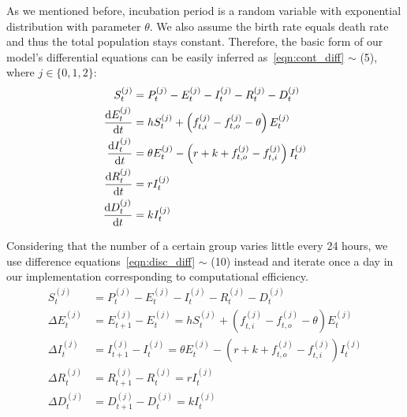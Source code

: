 \documentclass[12pt]{mcmthesis}
\begin{document}
As we mentioned before, incubation period is a random variable with exponential distribution with parameter $\theta$. We also assume the birth rate equals death rate and thus the total population stays constant. Therefore, the basic form of our model's differential equations can be easily inferred as~\eqref{eqn:cont_diff} $\sim$ (5), where $j \in \lbrace 0, 1, 2 \rbrace$:
\begin{align} \label{eqn:cont_diff}
S_t^{(j)} &= P_t^{(j)} - E_t^{(j)} - I_t^{(j)} - R_t^{(j)} - D_t^{(j)} \\
\frac{{\rm d}E_t^{(j)}}{{\rm d}t} &= hS_t^{(j)} + \left(f_{t, i}^{(j)} - f_{t, o}^{(j)} - \theta\right)E_t^{(j)} \\
\frac{{\rm d}I_t^{(j)}}{{\rm d}t} &= \theta E_t^{(j)} - \left(r + k + f_{t,o}^{(j)} - f_{t,i}^{(j)}\right)I_t^{(j)} \\
\frac{{\rm d}R_t^{(j)}}{{\rm d}t} &= rI_t^{(j)} \\
\frac{{\rm d}D_t^{(j)}}{{\rm d}t} &= kI_t^{(j)}
\end{align}

Considering that the number of a certain group varies little every 24 hours, we use difference equations~\eqref{eqn:disc_diff} $\sim$ (10) instead and iterate once a day in our implementation corresponding to computational efficiency.
\begin{align} \label{eqn:disc_diff}
S_t^{(j)} &= P_t^{(j)} - E_t^{(j)} - I_t^{(j)} - R_t^{(j)} - D_t^{(j)} \\
\Delta E_t^{(j)} &= E_{t+1}^{(j)} - E_t^{(j)} = hS_t^{(j)} + \left(f_{t,i}^{(j)} - f_{t,o}^{(j)} - \theta\right)E_t^{(j)} \\
\Delta I_t^{(j)} &= I_{t+1}^{(j)} - I_t^{(j)} = \theta E_t^{(j)} - \left(r + k + f_{t,o}^{(j)} - f_{t,i}^{(j)}\right)I_t^{(j)} \\
\Delta R_t^{(j)} &= R_{t+1}^{(j)} - R_t^{(j)} = rI_t^{(j)} \\
\Delta D_t^{(j)} &= D_{t+1}^{(j)} - D_t^{(j)} = kI_t^{(j)}
\end{align}
\end{document}
